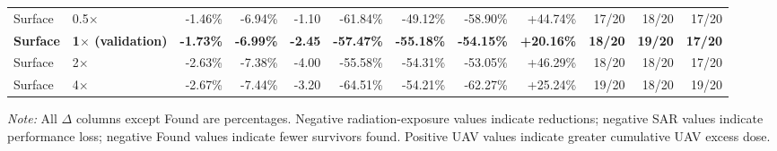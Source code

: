 \begin{table}[t]
{\begin{tabular}{llrrrrrrrrrr}
Surface & 0.5$\times$ & -1.46\% & -6.94\% & -1.10 & -61.84\% & -49.12\% & -58.90\% & +44.74\% & 17/20 & 18/20 & 17/20 \\
\textbf{Surface} & \textbf{1$\times$ (validation)} & \textbf{-1.73\%} & \textbf{-6.99\%} & \textbf{-2.45} & \textbf{-57.47\%} & \textbf{-55.18\%} & \textbf{-54.15\%} & \textbf{+20.16\%} & \textbf{18/20} & \textbf{19/20} & \textbf{17/20} \\
Surface & 2$\times$ & -2.63\% & -7.38\% & -4.00 & -55.58\% & -54.31\% & -53.05\% & +46.29\% & 18/20 & 18/20 & 17/20 \\
Surface & 4$\times$ & -2.67\% & -7.44\% & -3.20 & -64.51\% & -54.21\% & -62.27\% & +25.24\% & 19/20 & 18/20 & 19/20 \\
\bottomrule
\end{tabular}%
}
\vspace{0.4em}
\begin{minipage}{0.98\textwidth}\footnotesize
\textit{Note:} All $\Delta$ columns except Found are percentages. Negative radiation-exposure values indicate reductions; negative SAR values indicate performance loss; negative Found values indicate fewer survivors found. Positive UAV values indicate greater cumulative UAV excess dose.
\end{minipage}
\end{table}
